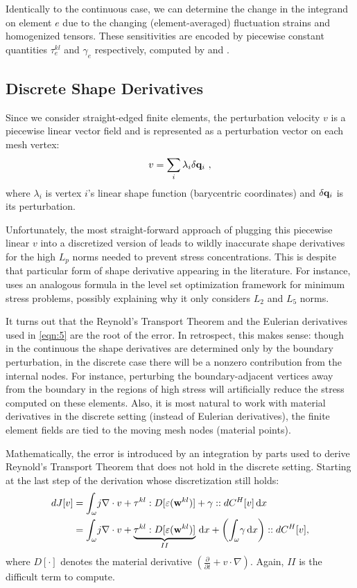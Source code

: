 \documentclass[10pt]{article}
\renewcommand{\div}{\nabla \cdot}
\providecommand{\shape}{\omega}
\providecommand{\vint}[3][x]{\int_{#2} \! #3 \, \mathrm{d}#1}
\providecommand{\pder}[2]{\frac{\partial #1}{\partial #2}}
\renewcommand{\vec}[1]{{\bf #1}}
\newcommand\pr[1]{\prettyref{#1}}
\def\w{\vec{w}}
\def\q{\vec{q}}
\def\strain{\varepsilon}
\begin{document}
Identically to the continuous case, we can determine the change in the
integrand on element $e$ due to the changing (element-averaged) fluctuation
strains and homogenized tensors. These sensitivities are encoded by piecewise
constant quantities $\tau^{kl}_e$ and $\gamma_e$ respectively, computed by
\pr{eqn:tau} and \pr{eqn:gamma}.

\subsection{Discrete Shape Derivatives}
Since we consider straight-edged finite elements, the perturbation velocity
$v$ is a piecewise linear vector field and is represented as a perturbation
vector on each mesh vertex:
$$
v = \sum_{i} \lambda_i \delta \q_i\ ,
$$
where $\lambda_i$ is vertex $i$'s linear shape function (barycentric
coordinates) and $\delta \q_i$ is its perturbation.

Unfortunately, the most straight-forward approach of plugging this piecewise
linear $v$ into a discretized version of \pr{eqn:cts_shape_der} leads to wildly
inaccurate shape derivatives for the high $L_p$ norms needed to prevent stress
concentrations. This is despite that particular form of shape derivative
appearing in the literature. For instance, \cite{Allaire2008909} uses an analogous
formula in the level set optimization framework for minimum stress problems,
possibly explaining why it only considers $L_2$ and $L_5$ norms.

It turns out that the Reynold's Transport Theorem and the Eulerian derivatives
used in \ref{eqn:5} are the root of the error. In retrospect, this makes
sense: though in the continuous the shape derivatives are determined only by
the boundary perturbation, in the discrete case there will be a nonzero
contribution from the internal nodes. For instance, perturbing the
boundary-adjacent vertices away from the boundary in the regions of high stress
will artificially reduce the stress computed on these elements. Also, it is
most natural to work with material derivatives in the discrete setting (instead
of Eulerian derivatives), the finite element fields are tied to the moving mesh
nodes (material points).

Mathematically, the error is introduced by an integration by parts used to
derive Reynold's Transport Theorem that does not hold in the discrete setting.
Starting at the last step of the derivation whose discretization still holds:
\begin{align}
\notag
dJ[v]
&= \vint{\shape}{j \div v + \tau^{kl} : D[\strain(\w^{kl})] + \gamma :: dC^H[v]} \\
&= \vint{\shape}{j \div v + \underbrace{\tau^{kl} : D[\strain(\w^{kl})]}_{II}} + \left(\vint{\shape}{\gamma}\right) :: dC^H[v],
\label{eqn:discretizable_dJ}
\end{align}
where $D[\cdot]$ denotes the material derivative $\left(\pder{}{t} + v \cdot
\nabla\right)$. Again, $II$ is the difficult term to compute.
\end{document}
